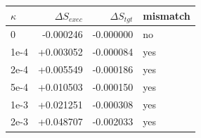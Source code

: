 \begin{tabular}{lrrl}
\toprule
$\kappa$ & $\Delta S_{exec}$ & $\Delta S_{tgt}$ & mismatch \\
\midrule
0 & -0.000246 & -0.000000 & no \\
1e-4 & +0.003052 & -0.000084 & yes \\
2e-4 & +0.005549 & -0.000186 & yes \\
5e-4 & +0.010503 & -0.000150 & yes \\
1e-3 & +0.021251 & -0.000308 & yes \\
2e-3 & +0.048707 & -0.002033 & yes \\
\bottomrule
\end{tabular}

